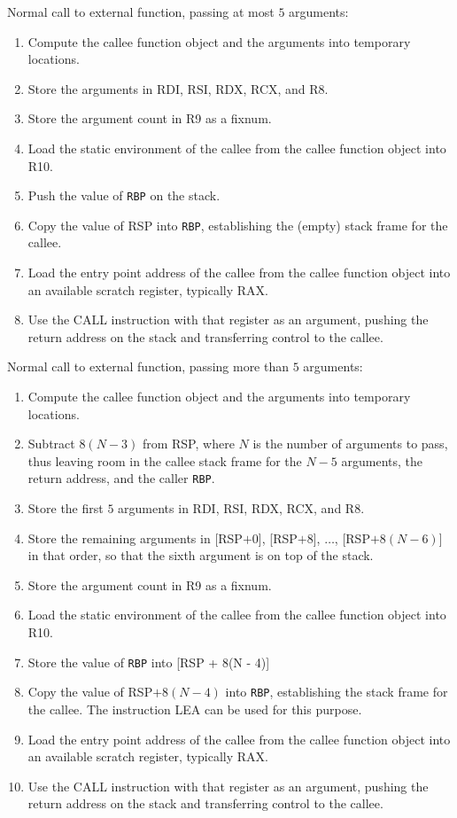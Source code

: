 Normal call to external function, passing at most $5$ arguments:

\begin{enumerate}
\item Compute the callee function object and the arguments into
  temporary locations.
\item Store the arguments in RDI, RSI, RDX, RCX, and R8.
\item Store the argument count in R9 as a fixnum.
\item Load the static environment of the callee from the callee
  function object into R10.
\item Push the value of \texttt{RBP} on the stack.
\item Copy the value of RSP into \texttt{RBP}, establishing the
  (empty) stack frame for the callee.
\item Load the entry point address of the callee from the callee
  function object into an available scratch register, typically RAX.
\item Use the CALL instruction with that register as an argument,
  pushing the return address on the stack and transferring control to
  the callee.
\end{enumerate}

Normal call to external function, passing more than $5$ arguments:

\begin{enumerate}
\item Compute the callee function object and the arguments into
  temporary locations.
\item Subtract $8(N - 3)$ from RSP, where $N$ is the number of
  arguments to pass, thus leaving room in the callee stack frame for
  the $N - 5$ arguments, the return address, and the caller \texttt{RBP}.
\item Store the first $5$ arguments in RDI, RSI, RDX, RCX, and R8.
\item Store the remaining arguments in [RSP$ + 0$], [RSP$ + 8$],
  $\ldots$, [RSP$ + 8(N - 6)$] in that order, so that the sixth
  argument is on top of the stack.
\item Store the argument count in R9 as a fixnum.
\item Load the static environment of the callee from the callee
  function object into R10.
\item Store the value of \texttt{RBP} into [RSP + 8(N - 4)]
\item Copy the value of RSP$ + 8(N - 4)$ into \texttt{RBP}, establishing the
  stack frame for the callee.  The instruction LEA can be used for
  this purpose.
\item Load the entry point address of the callee from the callee
  function object into an available scratch register, typically RAX.
\item Use the CALL instruction with that register as an argument,
  pushing the return address on the stack and transferring control to
  the callee.
\end{enumerate}

